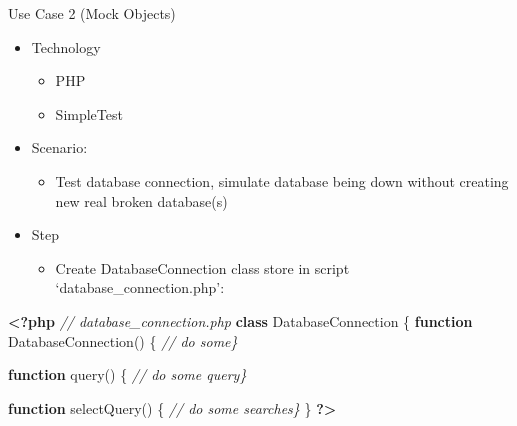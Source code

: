 \documentclass[
  ignorenonframetext,
]{beamer}
\newenvironment{Shaded}{\begin{snugshade}}{\end{snugshade}}
\newcommand{\CommentTok}[1]{\textcolor[rgb]{0.56,0.35,0.01}{\textit{#1}}}
\newcommand{\ConstantTok}[1]{\textcolor[rgb]{0.00,0.00,0.00}{#1}}
\newcommand{\KeywordTok}[1]{\textcolor[rgb]{0.13,0.29,0.53}{\textbf{#1}}}
\newcommand{\NormalTok}[1]{#1}
\providecommand{\tightlist}{%
  \setlength{\itemsep}{0pt}\setlength{\parskip}{0pt}}
\begin{document}
\begin{frame}[fragile]{Use Case 2 (Mock Objects)}
\protect\hypertarget{use-case-2-mock-objects}{}
\begin{itemize}
\tightlist
\item
  Technology

  \begin{itemize}
  \tightlist
  \item
    PHP
  \item
    SimpleTest
  \end{itemize}
\item
  Scenario:

  \begin{itemize}
  \tightlist
  \item
    Test database connection, simulate database being down without
    creating new real broken database(s)
  \end{itemize}
\item
  Step

  \begin{itemize}
  \tightlist
  \item
    Create DatabaseConnection class store in script
    `database\_connection.php':
  \end{itemize}
\end{itemize}

\begin{Shaded}
\begin{Highlighting}[]
\KeywordTok{\textless{}?php}
\CommentTok{// database\_connection.php}
\KeywordTok{class} \ConstantTok{D}\NormalTok{atabaseConnection \{}
    \KeywordTok{function} \ConstantTok{D}\NormalTok{atabaseConnection() \{ }\CommentTok{// do some\}}
    
    \KeywordTok{function}\NormalTok{ query() \{ }\CommentTok{// do some query\}}
    
    \KeywordTok{function}\NormalTok{ selectQuery() \{ }\CommentTok{// do some searches\}}
\NormalTok{\}}
\KeywordTok{?\textgreater{}}
\end{Highlighting}
\end{Shaded}
\end{frame}
\end{document}
